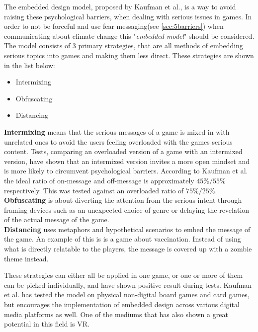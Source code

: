     The embedded design model, proposed by Kaufman et al., is a way to avoid raising these psychological barriers, when dealing with serious issues in games\cite{embeddedDesignModel}. In order to not be forceful and use fear messaging(see \autoref{sec:5barriers}) when communicating about climate change this "\textit{embedded model}" should be considered\cite{embeddedDesignModel}. The model consists of 3 primary strategies, that are all methods of embedding serious topics into games and making them less direct. These strategies are shown in the list below:
    \begin{itemize}
        \item Intermixing
        \item Obfuscating
        \item Distancing
    \end{itemize}
    
    \textbf{Intermixing} means that the serious messages of a game is mixed in with unrelated ones to avoid the users feeling overloaded with the games serious content\cite{embeddedDesignModel}. Tests, comparing an overloaded version of a game with an intermixed version, have shown that an intermixed version invites a more open mindset and is more likely to circumvent psychological barriers\cite{embeddedDesignModel}. According to Kaufman et al. the ideal ratio of on-message and off-message is approximately $45\%/55\%$ respectively. This was tested against an overloaded ratio of $75\%/25\%$.\\
    \textbf{Obfuscating} is about diverting the attention from the serious intent through framing devices such as an unexpected choice of genre or delaying the revelation of the actual message of the game\cite{embeddedDesignModel}.\\
    \textbf{Distancing} uses metaphors and hypothetical scenarios to embed the message of the game. An example of this is is a game about vaccination. Instead of using what is directly relatable to the players, the message is covered up with a zombie theme instead\cite{embeddedDesignModel}.
    
    These strategies can either all be applied in one game, or one or more of them can be picked individually, and have shown positive result during tests\cite{embeddedDesignModel, embeddedDesignModelTestDetails}. Kaufman et al. has tested the model on physical non-digital board games and card games, but encourages the implementation of embedded design across various digital media platforms as well\cite{embeddedDesignModel}. One of the mediums that has also shown a great potential in this field is VR\cite{persuasiveGameplay, vrCapabilitiesSlater}.
    
